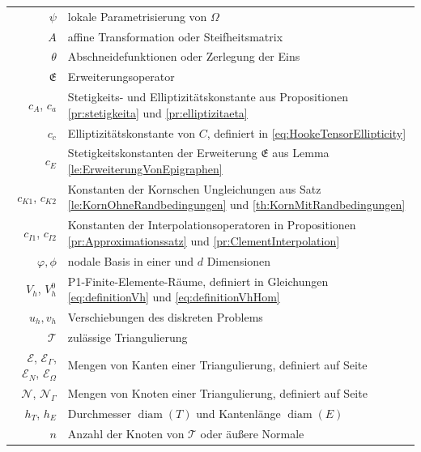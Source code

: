 \documentclass{scrartcl}
\newcommand{\cE}{\mathcal{E}}
\newcommand{\cN}{\mathcal{N}}
\newcommand{\cT}{\mathcal{T}}
\newcommand{\erw}{\mathfrak{E}}			%
\DeclareMathOperator{\diam}{diam}         %
\begin{document}
\begin{tabular}{rl}
	$\psi$ & lokale Parametrisierung von $\Omega$ \\
	$A$ & affine Transformation oder Steifheitsmatrix \\
	$\theta$ & Abschneidefunktionen oder Zerlegung der Eins \\
	$\erw$ & Erweiterungsoperator \\
	$c_A$, $c_a$ & Stetigkeits- und Elliptizitätskonstante aus Propositionen \ref{pr:stetigkeita} und \ref{pr:elliptizitaeta} \\
	$c_c$ & Elliptizitätskonstante von $C$, definiert in \eqref{eq:HookeTensorEllipticity} \\
	$c_{E}$ & Stetigkeitskonstanten der Erweiterung $\erw$ aus Lemma \ref{le:ErweiterungVonEpigraphen} \\
	$c_{K1}$, $c_{K2}$ & Konstanten der Kornschen Ungleichungen aus Satz \ref{le:KornOhneRandbedingungen} und \ref{th:KornMitRandbedingungen} \\
	$c_{I1}$, $c_{I2}$ & Konstanten der Interpolationsoperatoren in Propositionen \ref{pr:Approximationssatz} und \ref{pr:ClementInterpolation} \\
	$\varphi,\phi$ & nodale Basis in einer und $d$ Dimensionen \\
	$V_h$, $V_h^0$ & P1-Finite-Elemente-Räume, definiert in Gleichungen \eqref{eq:definitionVh} und \eqref{eq:definitionVhHom} \\
	$u_h,v_h$ & Verschiebungen des diskreten Problems \\
	$\cT$ & zulässige Triangulierung \\
	$\cE$, $\cE_\Gamma$, $\cE_N$, $\cE_\Omega$ & Mengen von Kanten einer Triangulierung, definiert auf Seite \pageref{se:definitionEN} \\
	$\cN$, $\cN_\Gamma$ & Mengen von Knoten einer Triangulierung, definiert auf Seite \pageref{se:definitionEN} \\
	$h_T$, $h_E$ & Durchmesser $\diam(T)$ und Kantenlänge $\diam(E)$ \\
	$n$ & Anzahl der Knoten von $\cT$ oder äußere Normale \\
\end{tabular}

\end{document}
